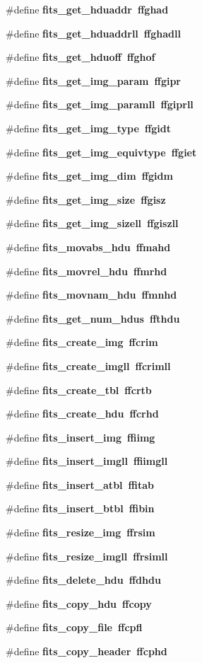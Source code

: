 \begin{CompactItemize}
\item 
\#define \bf{fits\_\-get\_\-hduaddr}~ffghad
\item 
\#define \bf{fits\_\-get\_\-hduaddrll}~ffghadll
\item 
\#define \bf{fits\_\-get\_\-hduoff}~ffghof
\item 
\#define \bf{fits\_\-get\_\-img\_\-param}~ffgipr
\item 
\#define \bf{fits\_\-get\_\-img\_\-paramll}~ffgiprll
\item 
\#define \bf{fits\_\-get\_\-img\_\-type}~ffgidt
\item 
\#define \bf{fits\_\-get\_\-img\_\-equivtype}~ffgiet
\item 
\#define \bf{fits\_\-get\_\-img\_\-dim}~ffgidm
\item 
\#define \bf{fits\_\-get\_\-img\_\-size}~ffgisz
\item 
\#define \bf{fits\_\-get\_\-img\_\-sizell}~ffgiszll
\item 
\#define \bf{fits\_\-movabs\_\-hdu}~ffmahd
\item 
\#define \bf{fits\_\-movrel\_\-hdu}~ffmrhd
\item 
\#define \bf{fits\_\-movnam\_\-hdu}~ffmnhd
\item 
\#define \bf{fits\_\-get\_\-num\_\-hdus}~ffthdu
\item 
\#define \bf{fits\_\-create\_\-img}~ffcrim
\item 
\#define \bf{fits\_\-create\_\-imgll}~ffcrimll
\item 
\#define \bf{fits\_\-create\_\-tbl}~ffcrtb
\item 
\#define \bf{fits\_\-create\_\-hdu}~ffcrhd
\item 
\#define \bf{fits\_\-insert\_\-img}~ffiimg
\item 
\#define \bf{fits\_\-insert\_\-imgll}~ffiimgll
\item 
\#define \bf{fits\_\-insert\_\-atbl}~ffitab
\item 
\#define \bf{fits\_\-insert\_\-btbl}~ffibin
\item 
\#define \bf{fits\_\-resize\_\-img}~ffrsim
\item 
\#define \bf{fits\_\-resize\_\-imgll}~ffrsimll
\item 
\#define \bf{fits\_\-delete\_\-hdu}~ffdhdu
\item 
\#define \bf{fits\_\-copy\_\-hdu}~ffcopy
\item 
\#define \bf{fits\_\-copy\_\-file}~ffcpfl
\item 
\#define \bf{fits\_\-copy\_\-header}~ffcphd
\item 

\end{CompactItemize}

